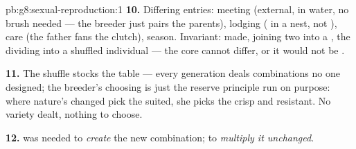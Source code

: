 \begin{solution}{pb:g8:sexual-reproduction:1}
\textbf{10.} Differing entries: meeting (external, in
water, no brush needed --- the breeder just pairs the
parents), lodging ( in a nest, not ), care (the
father fans the clutch), season. Invariant:  made,
 joining two into a , the 
dividing into a shuffled individual --- the core cannot
differ, or it would not be .

\textbf{11.} The shuffle stocks the table --- every
generation deals combinations no one designed; the
breeder's choosing is just the reserve principle run on
purpose: where nature's changed  pick the
suited, she picks the crisp and resistant. No variety
dealt, nothing to choose.

\textbf{12.}  was needed to
\emph{create} the new combination;  to \emph{multiply it unchanged}.
\end{solution}
